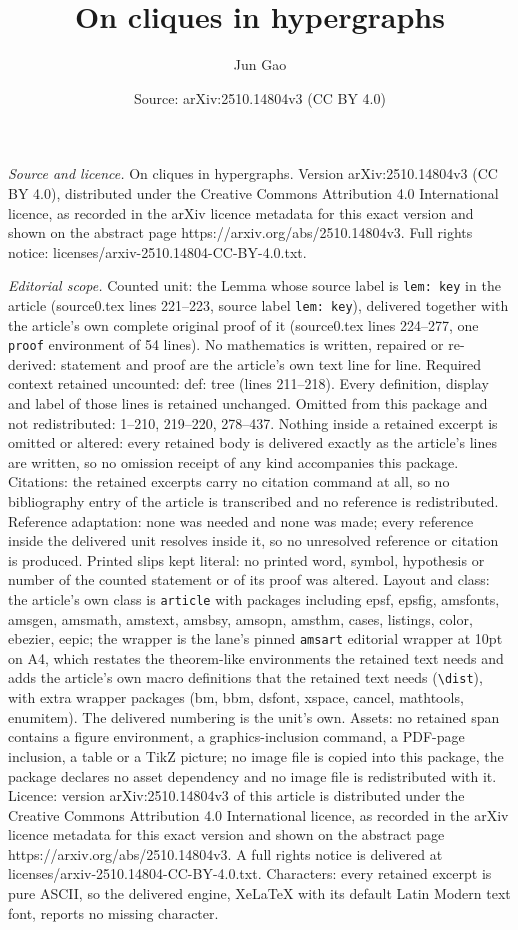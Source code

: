 \documentclass[10pt,a4paper]{amsart}
\title[On cliques in hypergraphs]{On cliques in hypergraphs}
\author{Jun Gao}
\date{Source: arXiv:2510.14804v3 (CC BY 4.0)}
\begin{document}
\maketitle

\noindent\emph{Source and licence.} On cliques in hypergraphs. Version arXiv:2510.14804v3 (CC BY 4.0), distributed under the Creative Commons Attribution 4.0 International licence, as recorded in the arXiv licence metadata for this exact version and shown on the abstract page https://arxiv.org/abs/2510.14804v3. Full rights notice: licenses/arxiv-2510.14804-CC-BY-4.0.txt.\par\smallskip

\noindent\textit{Editorial scope.} Counted unit: the Lemma whose source label is \texttt{lem: key} in the article (source0.tex lines 221--223, source label \texttt{lem: key}), delivered together with the article's own complete original proof of it (source0.tex lines 224--277, one \texttt{proof} environment of 54 lines). No mathematics is written, repaired or re-derived: statement and proof are the article's own text line for line. Required context retained uncounted: def: tree (lines 211--218). Every definition, display and label of those lines is retained unchanged. Omitted from this package and not redistributed: 1--210, 219--220, 278--437. Nothing inside a retained excerpt is omitted or altered: every retained body is delivered exactly as the article's lines are written, so no omission receipt of any kind accompanies this package. Citations: the retained excerpts carry no citation command at all, so no bibliography entry of the article is transcribed and no reference is redistributed. Reference adaptation: none was needed and none was made; every reference inside the delivered unit resolves inside it, so no unresolved reference or citation is produced. Printed slips kept literal: no printed word, symbol, hypothesis or number of the counted statement or of its proof was altered. Layout and class: the article's own class is \texttt{article} with packages including epsf, epsfig, amsfonts, amsgen, amsmath, amstext, amsbsy, amsopn, amsthm, cases, listings, color, ebezier, eepic; the wrapper is the lane's pinned \texttt{amsart} editorial wrapper at 10pt on A4, which restates the theorem-like environments the retained text needs and adds the article's own macro definitions that the retained text needs (\texttt{\textbackslash dist}), with extra wrapper packages (bm, bbm, dsfont, xspace, cancel, mathtools, enumitem). The delivered numbering is the unit's own. Assets: no retained span contains a figure environment, a graphics-inclusion command, a PDF-page inclusion, a table or a TikZ picture; no image file is copied into this package, the package declares no asset dependency and no image file is redistributed with it. Licence: version arXiv:2510.14804v3 of this article is distributed under the Creative Commons Attribution 4.0 International licence, as recorded in the arXiv licence metadata for this exact version and shown on the abstract page https://arxiv.org/abs/2510.14804v3. A full rights notice is delivered at licenses/arxiv-2510.14804-CC-BY-4.0.txt. Characters: every retained excerpt is pure ASCII, so the delivered engine, XeLaTeX with its default Latin Modern text font, reports no missing character.
\end{document}
